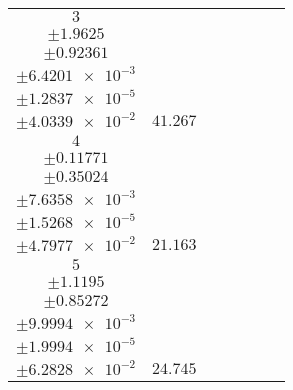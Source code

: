 \documentclass[8pt]{article}
\begin{document}
\begin{longtable}[l]{c c c c c c c}
$\num{3}$ & \begin{tabular}[c]{@{}c@{}}$\num{121.74}$ \\ $\pm\num{1.9625}$\end{tabular} & \begin{tabular}[c]{@{}c@{}}$\num{0.26867}$ \\ $\pm\num{0.92361}$\end{tabular} & \begin{tabular}[c]{@{}c@{}}$\num{2.6093e+3}$ \\ $\pm\num{6.4201e-3}$\end{tabular} & \begin{tabular}[c]{@{}c@{}}$\num{5.2171}$ \\ $\pm\num{1.2837e-5}$\end{tabular} & \begin{tabular}[c]{@{}c@{}}$\num{6.4963}$ \\ $\pm\num{4.0339e-2}$\end{tabular} & $\num{41.267}$\\
$\num{4}$ & \begin{tabular}[c]{@{}c@{}}$\num{63.54}$ \\ $\pm\num{0.11771}$\end{tabular} & \begin{tabular}[c]{@{}c@{}}$\num{0.32339}$ \\ $\pm\num{0.35024}$\end{tabular} & \begin{tabular}[c]{@{}c@{}}$\num{2.6116e+3}$ \\ $\pm\num{7.6358e-3}$\end{tabular} & \begin{tabular}[c]{@{}c@{}}$\num{5.2217}$ \\ $\pm\num{1.5268e-5}$\end{tabular} & \begin{tabular}[c]{@{}c@{}}$\num{7.5816}$ \\ $\pm\num{4.7977e-2}$\end{tabular} & $\num{21.163}$\\
$\num{5}$ & \begin{tabular}[c]{@{}c@{}}$\num{75.222}$ \\ $\pm\num{1.1195}$\end{tabular} & \begin{tabular}[c]{@{}c@{}}$\num{-0.12465}$ \\ $\pm\num{0.85272}$\end{tabular} & \begin{tabular}[c]{@{}c@{}}$\num{2.6167e+3}$ \\ $\pm\num{9.9994e-3}$\end{tabular} & \begin{tabular}[c]{@{}c@{}}$\num{5.2319}$ \\ $\pm\num{1.9994e-5}$\end{tabular} & \begin{tabular}[c]{@{}c@{}}$\num{8.4417}$ \\ $\pm\num{6.2828e-2}$\end{tabular} & $\num{24.745}$\\

\end{longtable}
\end{document}

